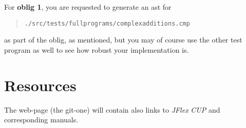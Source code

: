 \documentclass[10pt,freeform]{handout}[2014/08/13]
\begin{document}
For \textbf{oblig 1}, you are requested to generate an ast for
\begin{quote}
  \texttt{./src/tests/fullprograms/complexadditions.cmp}  
\end{quote}
as part of the oblig, as mentioned, but you may of course use the other
test program as well to see how robust your implementation is. 








\section{Resources}
\label{sec:resources}

The web-page (the git-one) will contain also links to \textsl{JFlex}
\textsl{CUP} and corresponding manuals.
\end{document}
